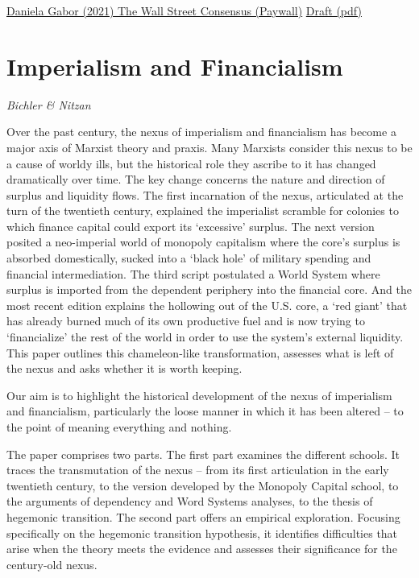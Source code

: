 \documentclass[
]{book}
\begin{document}
\href{https://onlinelibrary.wiley.com/doi/abs/10.1111/dech.12645}{Daniela Gabor (2021) The Wall Street Consensus (Paywall)}
\href{pdf/Gabor_2021_Wall_Street_Consensus.pdf}{Draft (pdf)}

\hypertarget{imperialism-and-financialism}{%
\section{Imperialism and Financialism}\label{imperialism-and-financialism}}

\emph{Bichler \& Nitzan}

Over the past century, the nexus of imperialism and financialism has become a major axis
of Marxist theory and praxis. Many Marxists consider this nexus to be a cause of worldy
ills, but the historical role they ascribe to it has changed dramatically over time. The key
change concerns the nature and direction of surplus and liquidity flows. The first
incarnation of the nexus, articulated at the turn of the twentieth century, explained the
imperialist scramble for colonies to which finance capital could export its `excessive'
surplus. The next version posited a neo-imperial world of monopoly capitalism where the
core's surplus is absorbed domestically, sucked into a `black hole' of military spending
and financial intermediation. The third script postulated a World System where surplus is
imported from the dependent periphery into the financial core. And the most recent
edition explains the hollowing out of the U.S. core, a `red giant' that has already burned
much of its own productive fuel and is now trying to `financialize' the rest of the world in
order to use the system's external liquidity. This paper outlines this chameleon-like
transformation, assesses what is left of the nexus and asks whether it is worth keeping.

Our aim is to highlight the historical development of the
nexus of imperialism and financialism,
particularly the loose manner in which it has been altered --
to the point of meaning everything and nothing.

The paper comprises two parts. The first part examines the different schools. It
traces the transmutation of the nexus -- from its first articulation in the early twentieth
century, to the version developed by the Monopoly Capital school, to the arguments of
dependency and Word Systems analyses, to the thesis of hegemonic transition. The
second part offers an empirical exploration. Focusing specifically on the hegemonic
transition hypothesis, it identifies difficulties that arise when the theory meets the
evidence and assesses their significance for the century-old nexus.
\end{document}
